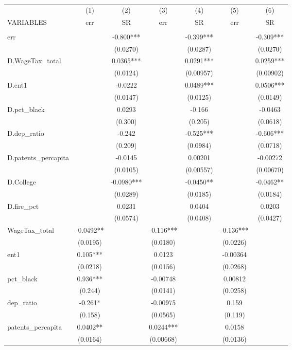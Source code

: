 \begin{tabular}{lcccccc} \hline
 & (1) & (2) & (3) & (4) & (5) & (6) \\
VARIABLES & err & SR & err & SR & err & SR \\ \hline
 &  &  &  &  &  &  \\
err &  & -0.800*** &  & -0.399*** &  & -0.309*** \\
 &  & (0.0270) &  & (0.0287) &  & (0.0270) \\
D.WageTax\_total &  & 0.0365*** &  & 0.0291*** &  & 0.0259*** \\
 &  & (0.0124) &  & (0.00957) &  & (0.00902) \\
D.ent1 &  & -0.0222 &  & 0.0489*** &  & 0.0506*** \\
 &  & (0.0147) &  & (0.0125) &  & (0.0149) \\
D.pct\_black &  & 0.0293 &  & -0.166 &  & -0.0463 \\
 &  & (0.300) &  & (0.205) &  & (0.0618) \\
D.dep\_ratio &  & -0.242 &  & -0.525*** &  & -0.606*** \\
 &  & (0.209) &  & (0.0984) &  & (0.0718) \\
D.patents\_percapita &  & -0.0145 &  & 0.00201 &  & -0.00272 \\
 &  & (0.0105) &  & (0.00557) &  & (0.00670) \\
D.College &  & -0.0980*** &  & -0.0450** &  & -0.0462** \\
 &  & (0.0289) &  & (0.0185) &  & (0.0184) \\
D.fire\_pct &  & 0.0231 &  & 0.0404 &  & 0.0203 \\
 &  & (0.0574) &  & (0.0408) &  & (0.0427) \\
WageTax\_total & -0.0492** &  & -0.116*** &  & -0.136*** &  \\
 & (0.0195) &  & (0.0180) &  & (0.0226) &  \\
ent1 & 0.105*** &  & 0.0123 &  & -0.00364 &  \\
 & (0.0218) &  & (0.0156) &  & (0.0268) &  \\
pct\_black & 0.936*** &  & -0.00748 &  & 0.00812 &  \\
 & (0.244) &  & (0.0141) &  & (0.0258) &  \\
dep\_ratio & -0.261* &  & -0.00975 &  & 0.159 &  \\
 & (0.158) &  & (0.0565) &  & (0.119) &  \\
patents\_percapita & 0.0402** &  & 0.0244*** &  & 0.0158 &  \\
 & (0.0164) &  & (0.00668) &  & (0.0136) &  \\

\end{tabular}
